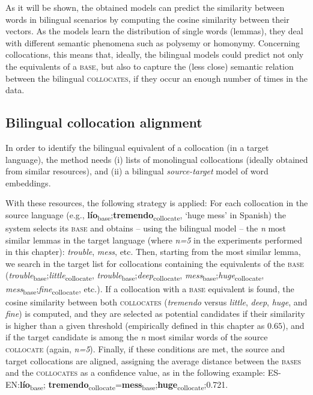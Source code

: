 \documentclass[output=paper
,modfonts
,nonflat]{langsci/langscibook}
\begin{document}
As it will be shown, the obtained models can predict the similarity between words
in bilingual scenarios by computing the cosine similarity between their vectors. As
the models learn the distribution of single words (lemmas), they deal with different
semantic phenomena such as polysemy or homonymy. Concerning collocations, this means
that, ideally, the bilingual models could predict not only the equivalents of a
\textsc{base}, but also to capture the (less close) semantic relation between the
bilingual \textsc{collocates}, if they occur an enough number of times in the data.

%
\subsection{Bilingual collocation alignment}
\label{garcia:sec:align}
In order to identify the bilingual equivalent of a collocation (in a target language),
the method needs (i) lists of monolingual collocations (ideally obtained from similar
resources), and (ii) a bilingual \emph{source-target} model of word embeddings.

With these resources, the following strategy is applied: For each collocation
in the source language (e.g., \textbf{lío}\textsubscript{base};\textbf{tremendo}\textsubscript{collocate},
`huge mess' in Spanish) the system selects its \textsc{base} and obtains -- using the bilingual model --
the \emph{n} most similar lemmas in the target language (where \emph{n=5} in the experiments
performed in this chapter): \textit{trouble}, \textit{mess}, etc. Then, starting from the most similar lemma,
we search in the target list for collocations containing the equivalents of
the \textsc{base} (\textit{trouble}\textsubscript{base};\textit{little}\textsubscript{collocate},
\textit{trouble}\textsubscript{base};\textit{deep}\textsubscript{collocate}, \textit{mess}\textsubscript{base};\textit{huge}\textsubscript{collocate}, \textit{mess}\textsubscript{base};\textit{fine}\textsubscript{collocate}, etc.). If a collocation with
a \textsc{base} equivalent is found, the cosine similarity between both \textsc{collocates}
(\textit{tremendo} versus \textit{little}, \textit{deep}, \textit{huge}, and \textit{fine}) is computed, and
they are selected as potential candidates if their similarity is higher than a given threshold
(empirically defined in this chapter as $0.65$), and if the target candidate is among the \emph{n}
most similar words of the source \textsc{collocate} (again, \emph{n=5}). Finally, if these conditions
are met, the source and target collocations are aligned, assigning the average distance between the
\textsc{bases} and the \textsc{collocates} as a confidence value, as in the following example:
ES-EN:\textbf{lío}\textsubscript{base}; \textbf{tremendo}\textsubscript{collocate}=\textbf{mess}\textsubscript{base};\textbf{huge}\textsubscript{collocate};0.721.
\end{document}
